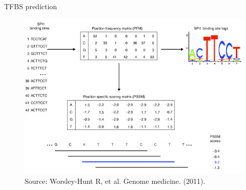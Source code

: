 \documentclass[slidestop,compress,11pt,xcolor=dvipsnames]{beamer}
\begin{document}
\begin{frame}[plain]{TFBS prediction}
 \vspace*{-0.3cm}
\begin{figure}
 \centering
 \includegraphics[width=0.95\linewidth]{intro/TFBS2.jpg}{\tiny{\\Source:  Worsley-Hunt R, et al.  Genome medicine. (2011). %
 }}
\end{figure}
\end{frame}
\end{document}
